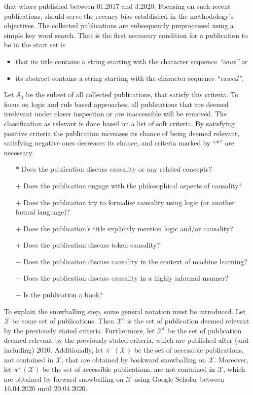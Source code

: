 \documentclass[11pt,a4paper]{book}
\theoremstyle{definition}
\theoremstyle{definition}
\theoremstyle{definition}
\theoremstyle{remark}
\newcommand{\xsetz}{\mathcal{S}_{\mathit{0}}}
\begin{document}
that where published between 01.2017 and 3.2020. Focusing on such recent publications, should serve the recency bias established in the methodology's objectives. 
The collected publications are subsequently preprocessed using a simple key word search. That is the first necessary condition for a publication to be in the start set is 
\begin{itemize}
\item  that its title contains a string starting with the character sequence \emph{``caus''} or 
\item  its abstract contains a string starting with the character sequence \emph{``causal''}. 
\end{itemize}
Let $\xsetz$ be the subset of all collected publications, that satisfy this criteria.
To focus on logic and rule based approaches, all publications that are deemed irrelevant under closer inspection or are inaccessible will be removed. The classification as relevant is done based on a list of soft criteria. By satisfying positive criteria the publication increases its chance of being deemed relevant, satisfying negative ones decreases its chance, and criteria marked by ``$\ast$'' are necessary.
\begin{itemize}
\item[$\ast$] Does the publication discuss causality or any related concepts? 
\item[$+$] Does the publication engage with the philosophical aspects of causality?
\item[$+$] Does the publication try to formalise causality using logic (or another formal language)?
\item[$+$] Does the publication's title explicitly mention logic and/or causality?
\item[$+$] Does the publication discuss token causality?
\item[$-$] Does the publication discuss causality in the context of machine learning?
\item[$-$] Does the publication discuss causality in a highly informal manner?
\item[$-$] Is the publication a book?
\end{itemize}

To explain the snowballing step, some general notation must be introduced. Let $\mathcal{X}$ be some set of publications.
Then $\mathcal{X}^c$ is the set of publication deemed relevant by the previously stated criteria. Furthermore, let $\mathcal{X}^{r}$ be the set of publication deemed relevant by the previously stated criteria, which are published after (and including) $2010$. 
Additionally, let $\pi^-(\mathcal{X})$ be the set of accessible publications, not contained in $\mathcal{X}$, that are obtained by backward snowballing on $\mathcal{X}$. Moreover, let $\pi^+(\mathcal{X})$ be the set of accessible publications, are not contained in $\mathcal{X}$, which are obtained by forward snowballing on $\mathcal{X}$ using Google Scholar between 16.04.2020 until 20.04.2020.
\end{document}
